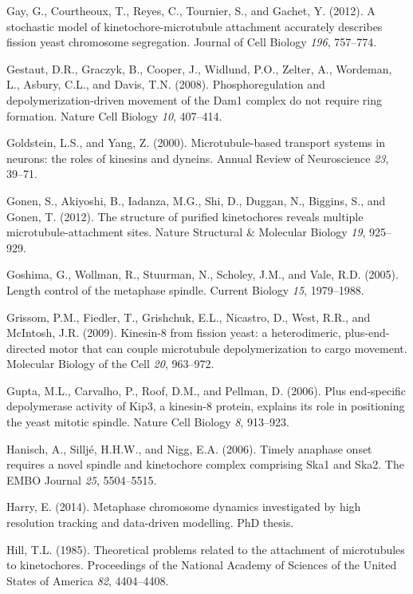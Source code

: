 \documentclass[12pt,a4paper,twoside,openright]{book}
\begin{document}
\hypertarget{ref-Gay2012a}{}
Gay, G., Courtheoux, T., Reyes, C., Tournier, S., and Gachet, Y. (2012).
A stochastic model of kinetochore-microtubule attachment accurately
describes fission yeast chromosome segregation. Journal of Cell Biology
\emph{196}, 757--774.

\hypertarget{ref-Gestaut2008}{}
Gestaut, D.R., Graczyk, B., Cooper, J., Widlund, P.O., Zelter, A.,
Wordeman, L., Asbury, C.L., and Davis, T.N. (2008). Phosphoregulation
and depolymerization-driven movement of the Dam1 complex do not require
ring formation. Nature Cell Biology \emph{10}, 407--414.

\hypertarget{ref-Goldstein2000}{}
Goldstein, L.S., and Yang, Z. (2000). Microtubule-based transport
systems in neurons: the roles of kinesins and dyneins. Annual Review of
Neuroscience \emph{23}, 39--71.

\hypertarget{ref-Gonen2012a}{}
Gonen, S., Akiyoshi, B., Iadanza, M.G., Shi, D., Duggan, N., Biggins,
S., and Gonen, T. (2012). The structure of purified kinetochores reveals
multiple microtubule-attachment sites. Nature Structural \& Molecular
Biology \emph{19}, 925--929.

\hypertarget{ref-Goshima2005}{}
Goshima, G., Wollman, R., Stuurman, N., Scholey, J.M., and Vale, R.D.
(2005). Length control of the metaphase spindle. Current Biology
\emph{15}, 1979--1988.

\hypertarget{ref-Grissom2009}{}
Grissom, P.M., Fiedler, T., Grishchuk, E.L., Nicastro, D., West, R.R.,
and McIntosh, J.R. (2009). Kinesin-8 from fission yeast: a
heterodimeric, plus-end-directed motor that can couple microtubule
depolymerization to cargo movement. Molecular Biology of the Cell
\emph{20}, 963--972.

\hypertarget{ref-Gupta2006}{}
Gupta, M.L., Carvalho, P., Roof, D.M., and Pellman, D. (2006). Plus
end-specific depolymerase activity of Kip3, a kinesin-8 protein,
explains its role in positioning the yeast mitotic spindle. Nature Cell
Biology \emph{8}, 913--923.

\hypertarget{ref-Hanisch2006}{}
Hanisch, A., Silljé, H.H.W., and Nigg, E.A. (2006). Timely anaphase
onset requires a novel spindle and kinetochore complex comprising Ska1
and Ska2. The EMBO Journal \emph{25}, 5504--5515.

\hypertarget{ref-Harry2014}{}
Harry, E. (2014). Metaphase chromosome dynamics investigated by high
resolution tracking and data-driven modelling. PhD thesis.

\hypertarget{ref-Hill1985}{}
Hill, T.L. (1985). Theoretical problems related to the attachment of
microtubules to kinetochores. Proceedings of the National Academy of
Sciences of the United States of America \emph{82}, 4404--4408.
\end{document}
